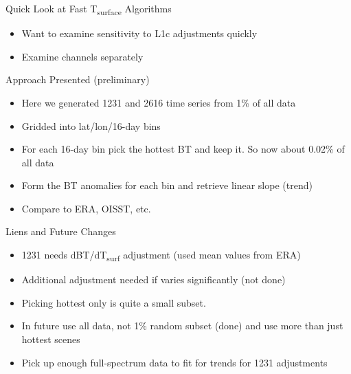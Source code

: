 \documentclass[10pt,t]{beamer}
\begin{document}
\begin{frame}[label={sec:orgd095c45},shrink=20]{Quick Look at Fast T\textsubscript{surface} Algorithms}
\begin{itemize}
\item Want to examine sensitivity to L1c adjustments \alert{quickly}
\item Examine channels separately
\end{itemize}

\begin{block}{Approach Presented (preliminary)}
\begin{itemize}
\item Here we generated 1231 and 2616 \wn time series from 1\% of all data
\item Gridded into lat/lon/16-day bins
\item For each 16-day bin pick the hottest BT and keep it.  So now about 0.02\% of all data
\item Form the BT anomalies for each bin and retrieve linear slope (trend)
\item Compare to ERA, OISST, etc.
\end{itemize}
\end{block}

\begin{block}{Liens and Future Changes}
\begin{itemize}
\item 1231 \wn needs dBT/dT\textsubscript{surf} adjustment (used mean values from ERA)
\item Additional adjustment needed if \water varies significantly (not done)
\item Picking hottest only is quite a small subset.
\item In future use all data, not 1\% random subset (done) and use more than just hottest scenes
\item Pick up enough full-spectrum data to fit for \water trends for 1231 \wn adjustments
\end{itemize}
\end{block}
\end{frame}
\end{document}
